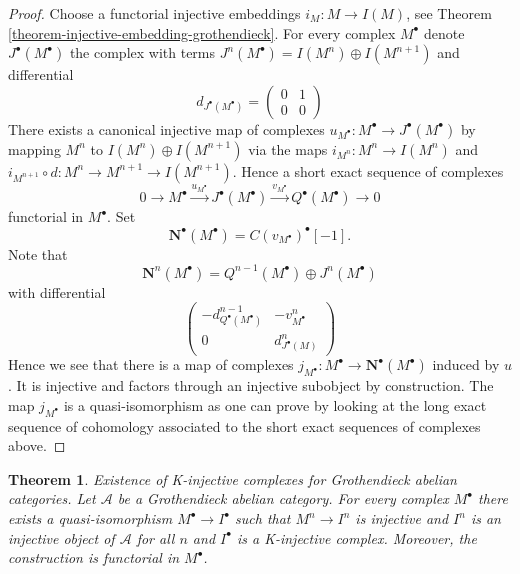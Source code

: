 \documentclass{stacks-project}
\newenvironment{slogan}{\comment}{\endcomment}
\theoremstyle{plain}
\newtheorem{theorem}[subsection]{Theorem}
\theoremstyle{definition}
\theoremstyle{remark}
\numberwithin{equation}{subsection}
\begin{document}
\begin{proof}
Choose a functorial injective embeddings $i_M : M \to I(M)$, see
Theorem \ref{theorem-injective-embedding-grothendieck}.
For every complex $M^\bullet$ denote $J^\bullet(M^\bullet)$ the complex
with terms $J^n(M^\bullet) = I(M^n) \oplus I(M^{n + 1})$ and differential
$$
d_{J^\bullet(M^\bullet)} =
\left(
\begin{matrix}
0 & 1 \\
0 & 0
\end{matrix}
\right)
$$
There exists a canonical injective map of complexes
$u_{M^\bullet} : M^\bullet \to J^\bullet(M^\bullet)$ by mapping $M^n$ to
$I(M^n) \oplus I(M^{n + 1})$ via the maps $i_{M^n} : M^n \to I(M^n)$ and
$i_{M^{n + 1}} \circ d : M^n \to M^{n + 1} \to I(M^{n + 1})$. Hence a
short exact sequence of complexes
$$
0 \to M^\bullet \xrightarrow{u_{M^\bullet}}
J^\bullet(M^\bullet) \xrightarrow{v_{M^\bullet}}
Q^\bullet(M^\bullet) \to 0
$$
functorial in $M^\bullet$. Set
$$
\mathbf{N}^\bullet(M^\bullet) = C(v_{M^\bullet})^\bullet[-1].
$$
Note that
$$
\mathbf{N}^n(M^\bullet) = Q^{n - 1}(M^\bullet) \oplus J^n(M^\bullet)
$$
with differential
$$
\left(
\begin{matrix}
- d^{n - 1}_{Q^\bullet(M^\bullet)} & - v^n_{M^\bullet} \\
0 & d^n_{J^\bullet(M)}
\end{matrix}
\right)
$$
Hence we see that there is a map of complexes
$j_{M^\bullet} : M^\bullet \to \mathbf{N}^\bullet(M^\bullet)$
induced by $u$. It is injective and factors through an injective subobject
by construction. The map $j_{M^\bullet}$ is a quasi-isomorphism as one
can prove by looking at the long exact sequence of cohomology associated
to the short exact sequences of complexes above.
\end{proof}

\begin{theorem}
\label{theorem-K-injective-embedding-grothendieck}
\begin{slogan}
Existence of K-injective complexes for Grothendieck abelian categories.
\end{slogan}
Let $\mathcal{A}$ be a Grothendieck abelian category.
For every complex $M^\bullet$ there exists a quasi-isomorphism
$M^\bullet \to I^\bullet$ such that $M^n \to I^n$ is injective and $I^n$
is an injective object of $\mathcal{A}$ for all $n$ and $I^\bullet$
is a K-injective complex. Moreover, the construction is functorial in
$M^\bullet$.
\end{theorem}
\end{document}
